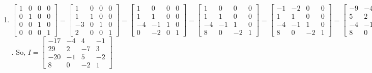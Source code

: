 \documentclass{article}
\begin{document}
\begin{enumerate}
	\item $
	\begin{bmatrix}
		1 	&0	&0	&0\\
		0	&1	&0	&0\\
		0	&0	&1	&0\\
		0	&0	&0	&1
	\end{bmatrix}
	= 
	\begin{bmatrix}
		1 	&0	&0	&0\\
		1	&1	&0	&0\\
		-3	&0	&1	&0\\
		2	&0	&0	&1
	\end{bmatrix}	
	=
	\begin{bmatrix}
		1 	&0	&0	&0\\
		1	&1	&0	&0\\
		-4	&-1	&1	&0\\
		0	&-2	&0	&1
	\end{bmatrix}
	= 
	\begin{bmatrix}
		1 	&0	&0	&0\\
		1	&1	&0	&0\\
		-4	&-1	&1	&0\\
		8	&0	&-2	&1
	\end{bmatrix}
	=
	\begin{bmatrix}
		-1 	&-2	&0	&0\\
		1	&1	&0	&0\\
		-4	&-1	&1	&0\\
		8	&0	&-2	&1
	\end{bmatrix}
	=
	\begin{bmatrix}
		-9 	&-4	&-2	&0\\
		5	&2	&-1	&0\\
		-4	&-1	&1	&0\\
		8	&0	&-2	&1
	\end{bmatrix}
	=
	\begin{bmatrix}
		-17 	&-4	&4	&-1\\
		29	&2	&-7	&3\\
		-20	&-1	&5	&-2\\
		8	&0	&-2	&1
	\end{bmatrix}
	$. So, $I = 
	\begin{bmatrix}
		-17 	&-4	&4	&-1\\
		29	&2	&-7	&3\\
		-20	&-1	&5	&-2\\
		8	&0	&-2	&1
	\end{bmatrix}
	$	
	

\end{enumerate}
\end{document}

